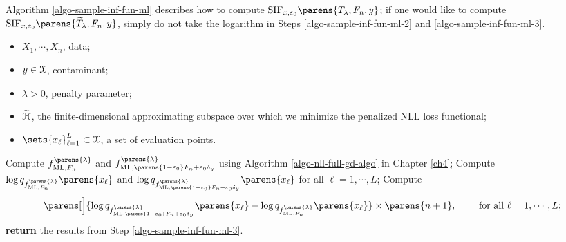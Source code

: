 Algorithm \ref{algo-sample-inf-fun-ml} describes how to compute $\mathrm{SIF}_{x, \varepsilon_0} \parens{T_{\lambda}, F_n, y}$; if one would like to compute $\mathrm{SIF}_{x, \varepsilon_0} \parens{\widetilde{T}_{\lambda}, F_n, y}$, simply do not take the logarithm in Steps \ref{algo-sample-inf-fun-ml-2} and \ref{algo-sample-inf-fun-ml-3}. 

\begin{algorithm}
\caption{Computation of $\mathrm{SIF}_{x, \varepsilon_0} \parens{T_{\lambda}, F_n, y}$}\label{algo-sample-inf-fun-ml}
\begin{algorithmic}[1]
\Statex \algorithmicrequire 
\begin{itemize}\setlength\itemsep{0em}
	\item $X_1, \cdots, X_n$, data; 
	\item $y \in \mathcal{X}$, contaminant; 
	\item $\lambda > 0$, penalty parameter; 
	\item $\widetilde{\mathcal{H}}$, the finite-dimensional approximating subspace over which we minimize the penalized NLL loss functional; 
	\item $\sets{x_{\ell}}_{\ell=1}^L \subset \calX$, a set of evaluation points. 
\end{itemize}

\vspace{5pt}

\State Compute $f_{\ML, F_n}^{\parens{\lambda}}$ and $f_{\ML, \parens{1 - \varepsilon_0} F_n + \varepsilon_0 \delta_y}^{\parens{\lambda}}$%
	using Algorithm \ref{algo-nll-full-gd-algo} in Chapter \ref{ch4}; 
\State Compute $\log q_{f_{\ML, F_n}^{\parens{\lambda}}} \parens{x_{\ell}}$ and $\log q_{f_{\ML, \parens{1 - \varepsilon_0} F_n + \varepsilon_0 \delta_y}^{\parens{\lambda}}} \parens{x_{\ell}}$ for all $\ell = 1, \cdots, L$; \label{algo-sample-inf-fun-ml-2}
\State Compute \label{algo-sample-inf-fun-ml-3}
\begin{align*}
	\parens[\Big]{\log q_{f_{\ML, \parens{1 - \varepsilon_0} F_n + \varepsilon_0 \delta_y}^{\parens{\lambda}}} \parens{x_{\ell}} - \log q_{f_{\ML, F_n}^{\parens{\lambda}}} \parens{x_{\ell}}} \times \parens{n+1}, \qquad \text{ for all } \ell = 1, \cdots, L; 
\end{align*}
\State \textbf{return} the results from Step \ref{algo-sample-inf-fun-ml-3}. 
\end{algorithmic}
\end{algorithm}

